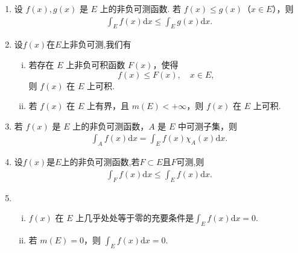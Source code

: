 \documentclass[../../main.tex]{subfiles}
\begin{document}
\begin{theorem}[非负可测函数积分的性质]\label{theorem:非负可测函数积分的性质}
\begin{enumerate}[(1)]
\item 设 \(f(x),g(x)\) 是 \(E\) 上的非负可测函数. 若 \(f(x)\leqslant g(x)\)（\(x\in E\)），则
\begin{align*}
\int_{E}f(x)\mathrm{d}x\leqslant \int_{E}g(x)\mathrm{d}x.
\end{align*}

\item 设$f(x)$在$E$上非负可测,我们有
\begin{enumerate}[(i)]
\item 若存在 \(E\) 上非负可积函数 \(F(x)\)，使得
\[f(x)\leqslant F(x),\quad x\in E,\]
则 \(f(x)\) 在 \(E\) 上可积.

\item 若 \(f(x)\) 在 \(E\) 上有界，且 \(m(E)< +\infty\)，则 \(f(x)\) 在 \(E\) 上可积.
\end{enumerate}

\item 若 \(f(x)\) 是 \(E\) 上的非负可测函数，\(A\) 是 \(E\) 中可测子集，则
\begin{align*}
\int_{A}f(x)\mathrm{d}x=\int_{E}f(x)\chi_{A}(x)\mathrm{d}x.
\end{align*}

\item 设$f(x)$是$E$上的非负可测函数,若$F\subset E$且$F$可测,则
\begin{align*}
\int_F{f\left( x \right) \mathrm{d}x}\leqslant \int_E{f\left( x \right) \mathrm{d}x}.
\end{align*}

\item \begin{enumerate}[(i)]
\item \(f(x)\) 在 \(E\) 上几乎处处等于零的充要条件是\(\int_{E}f(x)\mathrm{d}x = 0\).

\item 若 \(m(E)=0\)，则 \(\int_{E}f(x)\mathrm{d}x = 0\).
\end{enumerate}
\end{enumerate}
\end{theorem}
\end{document}

